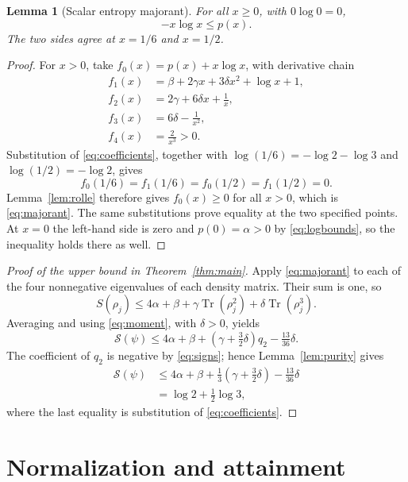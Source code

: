 \documentclass[11pt]{article}
\newtheorem{lemma}[theorem]{Lemma}
\theoremstyle{definition}
\theoremstyle{remark}
\DeclareMathOperator{\Tr}{Tr}
\begin{document}
\begin{lemma}[Scalar entropy majorant]
\label{lem:majorant}
For all $x\geq0$, with $0\log0=0$,
\begin{equation}
 -x\log x\leq p(x).
 \label{eq:majorant}
\end{equation}
The two sides agree at $x=1/6$ and $x=1/2$.
\end{lemma}
\begin{proof}
For $x>0$, take $f_0(x)=p(x)+x\log x$, with derivative chain
\begin{align*}
 f_1(x)&=\beta+2\gamma x+3\delta x^2+\log x+1,\\
 f_2(x)&=2\gamma+6\delta x+\frac1x,\\
 f_3(x)&=6\delta-\frac1{x^2},\\
 f_4(x)&=\frac2{x^3}>0.
\end{align*}
Substitution of \eqref{eq:coefficients}, together with
$\log(1/6)=-\log2-\log3$ and $\log(1/2)=-\log2$, gives
\[
 f_0(1/6)=f_1(1/6)=f_0(1/2)=f_1(1/2)=0.
\]
Lemma~\ref{lem:rolle} therefore gives $f_0(x)\geq0$ for all $x>0$,
which is \eqref{eq:majorant}. The same substitutions prove equality at
the two specified points. At $x=0$ the left-hand side is zero and
$p(0)=\alpha>0$ by \eqref{eq:logbounds}, so the inequality holds there
as well.
\end{proof}

\begin{proof}[Proof of the upper bound in Theorem~\ref{thm:main}]
Apply \eqref{eq:majorant} to each of the four nonnegative eigenvalues
of each density matrix. Their sum is one, so
\[
 S(\rho_j)\leq4\alpha+\beta+
       \gamma\Tr(\rho_j^2)+\delta\Tr(\rho_j^3).
\]
Averaging and using \eqref{eq:moment}, with $\delta>0$, yields
\[
 \mathcal S(\psi)\leq4\alpha+\beta+
       (\gamma+\tfrac32\delta)q_2-\tfrac{13}{36}\delta.
\]
The coefficient of $q_2$ is negative by \eqref{eq:signs}; hence
Lemma~\ref{lem:purity} gives
\begin{align*}
 \mathcal S(\psi)
 &\leq4\alpha+\beta+
       \tfrac13(\gamma+\tfrac32\delta)-\tfrac{13}{36}\delta\\
 &=\log2+\tfrac12\log3,
\end{align*}
where the last equality is substitution of \eqref{eq:coefficients}.
\end{proof}

\section{Normalization and attainment}
\label{sec:sharpness}
\end{document}

